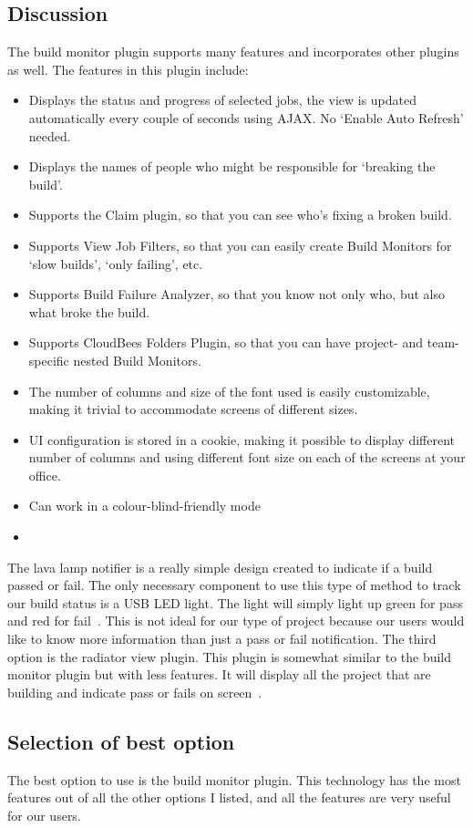 \documentclass[10pt,letterpaper,onecolumn,journal]{IEEEtran}
\begin{document}
\subsection{Discussion}
The build monitor plugin supports many features and incorporates other plugins as well.
The features in this plugin include:
\begin{itemize}
  \item Displays the status and progress of selected jobs, the view is updated automatically every couple of seconds using AJAX\@. No `Enable Auto Refresh' needed.
  \item Displays the names of people who might be responsible for `breaking the build'.
  \item Supports the Claim plugin, so that you can see who's fixing a broken build.
  \item Supports View Job Filters, so that you can easily create Build Monitors for `slow builds', `only failing', etc.
  \item Supports Build Failure Analyzer, so that you know not only who, but also what broke the build.
  \item Supports CloudBees Folders Plugin, so that you can have project- and team-specific nested Build Monitors.
  \item The number of columns and size of the font used is easily customizable, making it trivial to accommodate screens of different sizes.
  \item UI configuration is stored in a cookie, making it possible to display different number of columns and using different font size on each of the screens at your office.
  \item Can work in a colour-blind-friendly mode
  \item~\cite{buildmonitor}
\end{itemize}
The lava lamp notifier is a really simple design created to indicate if a build passed or fail.
The only necessary component to use this type of method to track our build status is a USB LED light.
The light will simply light up green for pass and red for fail~\cite{lavalamp}.
This is not ideal for our type of project because our users would like to know more information than just a pass or fail notification.
The third option is the radiator view plugin.
This plugin is somewhat similar to the build monitor plugin but with less features.
It will display all the project that are building and indicate pass or fails on screen~\cite{radiatorview}.
\subsection{Selection of best option}
The best option to use is the build monitor plugin.
This technology has the most features out of all the other options I listed, and all the features are very useful for our users.



\end{document}
